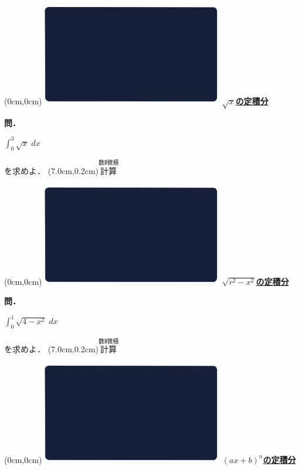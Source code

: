 \documentclass[10pt,
fleqn,
dvipdfmx,
uplatex
]{jsarticle}
\begin{document}
\newpage

\at(0cm,0cm){\includegraphics[width=8cm,bb=0 0 1920 1080]{./youtube/thumbnails/templates/smart_background/数II微積.jpeg}}
{\color{orange}\bf\boldmath\huge\underline{$\sqrt x$の定積分}}\vspace{0.3zw}

\large 
\bf\boldmath 問．

\Huge 
\vspace{-0.2zw}
\hspace{1zw}$\displaystyle\int_0^3\sqrt x\;dx$
\vspace{-0.5zw}

\large
\hfill
を求めよ．
\at(7.0cm,0.2cm){\small\color{bradorange}$\overset{\text{数Ⅱ微積}}{\text{計算}}$}

\newpage

\at(0cm,0cm){\includegraphics[width=8cm,bb=0 0 1920 1080]{./youtube/thumbnails/templates/smart_background/数II微積.jpeg}}
{\color{orange}\bf\boldmath\LARGE\underline{$\sqrt {r^2-x^2}$の定積分}}\vspace{0.3zw}

\large
\bf\boldmath 問．

\Huge 
\vspace{-0.2zw}
\hspace{0.5zw}$\displaystyle\int_0^1\sqrt {4-x^2}\;dx$
\vspace{-0.2zw}

\large
\hfill 
を求めよ．
\at(7.0cm,0.2cm){\small\color{bradorange}$\overset{\text{数Ⅱ微積}}{\text{計算}}$}

\newpage

\at(0cm,0cm){\includegraphics[width=8cm,bb=0 0 1920 1080]{./youtube/thumbnails/templates/smart_background/数II微積.jpeg}}
{\color{orange}\bf\boldmath\LARGE\underline{$\left(ax+b\right)^n$の定積分}}\vspace{0.3zw}
\end{document}
